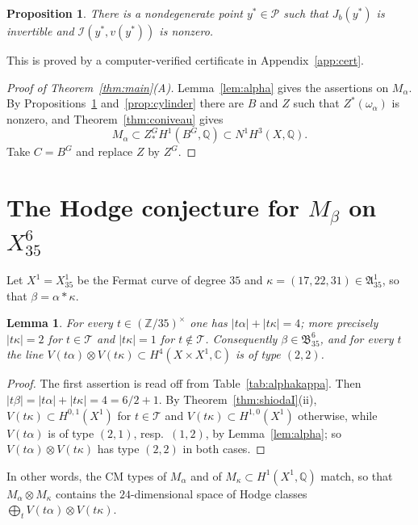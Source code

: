 \documentclass[11pt]{amsart}
\newtheorem{proposition}[theorem]{Proposition}
\newtheorem{lemma}[theorem]{Lemma}
\theoremstyle{definition}
\theoremstyle{remark}
\numberwithin{equation}{section}
\newcommand{\Q}{\mathbb{Q}}
\newcommand{\C}{\mathbb{C}}
\newcommand{\Z}{\mathbb{Z}}
\newcommand{\fA}{\mathfrak{A}}
\newcommand{\fB}{\mathfrak{B}}
\newcommand{\cP}{\mathcal{P}}
\newcommand{\cT}{\mathcal{T}}
\newcommand{\cI}{\mathcal{I}}
\begin{document}
\begin{proposition}\label{prop:certificate}
There is a nondegenerate point $y^*\in\cP$ such that $J_b(y^*)$ is invertible and $\cI(y^*,v(y^*))$ is nonzero.
\end{proposition}

This is proved by a computer-verified certificate in Appendix~\ref{app:cert}.

\begin{proof}[Proof of Theorem~\ref{thm:main}(A)]
Lemma~\ref{lem:alpha} gives the assertions on $M_\alpha$. By Propositions~\ref{prop:certificate} and~\ref{prop:cylinder} there are $B$ and $Z$ such that $Z^*(\omega_\alpha)$ is nonzero, and Theorem~\ref{thm:coniveau} gives
\[
M_\alpha\subset Z^G_*H^1(B^G,\Q)\subset N^1H^3(X,\Q).
\]
Take $C=B^G$ and replace $Z$ by $Z^G$.
\end{proof}

\section{\texorpdfstring{The Hodge conjecture for $M_\beta$ on $X^6_{35}$}{The Hodge conjecture for M(beta) on the Fermat sixfold of degree 35}}\label{sec:beta}

Let $X^1=X^1_{35}$ be the Fermat curve of degree $35$ and $\kappa=(17,22,31)\in\fA^1_{35}$, so that $\beta=\alpha*\kappa$.

\begin{lemma}\label{lem:kappa}
For every $t\in(\Z/35)^\times$ one has $|t\alpha|+|t\kappa|=4$; more precisely $|t\kappa|=2$ for $t\in\cT$ and $|t\kappa|=1$ for $t\notin\cT$. Consequently $\beta\in\fB^6_{35}$, and for every $t$ the line $V(t\alpha)\otimes V(t\kappa)\subset H^4(X\times X^1,\C)$ is of type $(2,2)$.
\end{lemma}

\begin{proof}
The first assertion is read off from Table~\ref{tab:alphakappa}. Then $|t\beta|=|t\alpha|+|t\kappa|=4=6/2+1$. By Theorem~\ref{thm:shiodaI}(ii), $V(t\kappa)\subset H^{0,1}(X^1)$ for $t\in\cT$ and $V(t\kappa)\subset H^{1,0}(X^1)$ otherwise, while $V(t\alpha)$ is of type $(2,1)$, resp.\ $(1,2)$, by Lemma~\ref{lem:alpha}; so $V(t\alpha)\otimes V(t\kappa)$ has type $(2,2)$ in both cases.
\end{proof}

In other words, the CM types of $M_\alpha$ and of $M_\kappa\subset H^1(X^1,\Q)$ match, so that $M_\alpha\otimes M_\kappa$ contains the $24$-dimensional space of Hodge classes $\bigoplus_tV(t\alpha)\otimes V(t\kappa)$.
\end{document}
